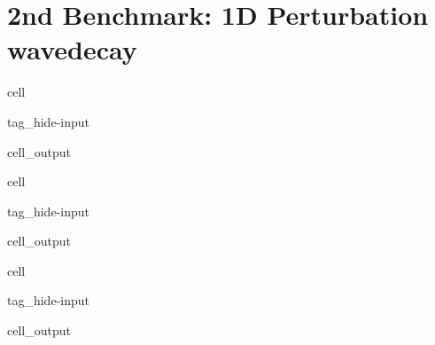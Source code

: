 \documentclass[letterpaper,10pt,english,openany,oneside]{jupyterBook}
\begin{document}
\section{2nd Benchmark: 1D Perturbation wave\sphinxhyphen{}decay}
\label{\detokenize{LBM-Study/Convective-Diffusive-Equation:nd-benchmark-1d-perturbation-wave-decay}}
\begin{sphinxuseclass}{cell}
\begin{sphinxuseclass}{tag_hide-input}\begin{sphinxVerbatimOutput}

\begin{sphinxuseclass}{cell_output}
\noindent{}

\end{sphinxuseclass}\end{sphinxVerbatimOutput}

\end{sphinxuseclass}
\end{sphinxuseclass}
\begin{sphinxuseclass}{cell}
\begin{sphinxuseclass}{tag_hide-input}\begin{sphinxVerbatimOutput}

\begin{sphinxuseclass}{cell_output}
\noindent{}

\end{sphinxuseclass}\end{sphinxVerbatimOutput}

\end{sphinxuseclass}
\end{sphinxuseclass}
\begin{sphinxuseclass}{cell}
\begin{sphinxuseclass}{tag_hide-input}\begin{sphinxVerbatimOutput}

\begin{sphinxuseclass}{cell_output}
\noindent{}

\end{sphinxuseclass}\end{sphinxVerbatimOutput}

\end{sphinxuseclass}
\end{sphinxuseclass}
\sphinxstepscope
\end{document}
